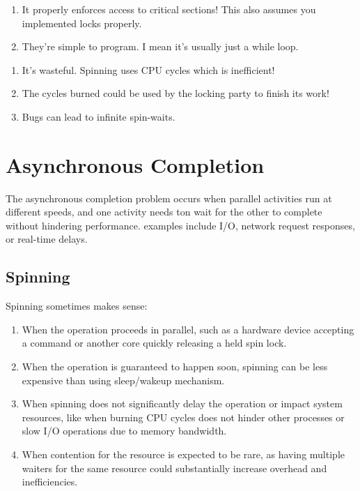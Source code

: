 \documentclass{report}
\begin{document}
\begin{tcbraster}[raster columns=2, raster equal height, raster force size=false]
  \begin{tcolorbox}[colback=green!5!white,colframe=black!75!green,title=Advantages]
    \begin{enumerate}[label=\textit{(\roman*)}]
    \item It properly enforces access to critical sections! This also assumes you implemented locks
      properly.
    \item They're simple to program. I mean it's usually just a while loop.
    \end{enumerate}
  \end{tcolorbox}
  \begin{tcolorbox}[colback=red!5!white,colframe=black!40!red,title=Disadvantages]
    \begin{enumerate}[label=\textit{(\roman*)}]
    \item It's wasteful. Spinning uses CPU cycles which is inefficient!
    \item The cycles burned could be used by the locking party to finish its work!
    \item Bugs can lead to infinite spin-waits.
    \end{enumerate}
  \end{tcolorbox}
\end{tcbraster}





\section{Asynchronous Completion}
The asynchronous completion problem occurs when parallel activities run at different speeds, and one
activity needs ton wait for the other to complete without hindering performance. examples include
I/O, network request responses, or real-time delays.


\subsection{Spinning}
Spinning sometimes makes sense:

\begin{enumerate}[label=\textit{(\roman*)}]
\item When the operation proceeds in parallel, such as a hardware device accepting a
  command or another core quickly releasing a held spin lock.
\item When the operation is guaranteed to happen soon, spinning can be less expensive than using
  sleep/wakeup mechanism. 
\item When spinning does not significantly delay the operation or impact system resources,
  like when burning CPU cycles does not hinder other processes or slow I/O operations due to memory
  bandwidth.
\item When contention for the resource is expected to be rare, as having multiple waiters for the
  same resource could substantially increase overhead and inefficiencies.
\end{enumerate}
\end{document}
